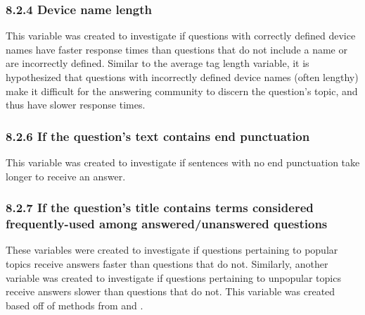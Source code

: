 \documentclass{article}
\begin{document}

\subsubsection*{8.2.4 Device name length}

This variable was created to investigate if questions with correctly defined device names have faster response times than questions that do not include a name or are incorrectly defined. Similar to the average tag length variable, it is hypothesized that questions with incorrectly defined device names (often lengthy) make it difficult for the answering community to discern the question's topic, and thus have slower response times. 


\subsubsection*{8.2.6 If the question's text contains end punctuation}

This variable was created to investigate if sentences with no end punctuation take longer to receive an answer.


\subsubsection*{8.2.7 If the question's title contains terms considered frequently-used among answered/unanswered questions}

These variables were created to investigate if questions pertaining to popular topics receive answers faster than questions that do not. Similarly, another variable was created to investigate if questions pertaining to unpopular topics receive answers slower than questions that do not. This variable was created based off of methods from \cite{Correa2013} and \cite{Ravi2014}.
\end{document}
